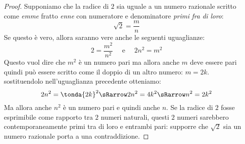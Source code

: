 \begin{proof}{}{}
Supponiamo che la radice di \(2\) sia uguale a un numero razionale 
scritto come \emph{emme} fratto \emph{enne} con numeratore e denominatore 
\emph{primi fra di loro}: 
\[\sqrt{2}=\dfrac{m}{n}\]
Se questo è vero, allora saranno vere anche le seguenti uguaglianze:
\[2= \dfrac{m^2}{n^2} \quad \text{ e } \quad 2n^2 = m^2\]
Questo vuol dire che \(m^2\) è un numero pari ma allora anche \(m\) deve 
essere pari quindi può essere scritto come il doppio di un altro numero:
\(m=2k\). sostituendolo nell'uguaglianza precedente otteniamo:
\[2n^2 = \tonda{2k}^2 \sRarrow 2n^2 = 4k^2 \sRarrow n^2 = 2k^2\]
Ma allora anche \(n^2\) è un numero pari e quindi anche \(n\).
Se la radice di \(2\) fosse esprimibile come rapporto tra \(2\) numeri 
naturali, questi \(2\) numeri sarebbero contemporaneamente primi tra di 
loro e entrambi pari: supporre che \(\sqrt{2}\) sia un numero razionale 
porta a una contraddizione.
\end{proof}



